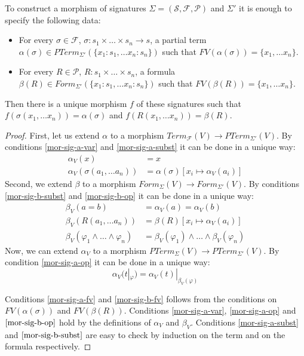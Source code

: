 \documentclass[reqno]{amsart}
\theoremstyle{definition}
\theoremstyle{remark}
\numberwithin{figure}{section}
\begin{document}
\begin{prop}
To construct a morphism of signatures $\Sigma = (\mathcal{S},\mathcal{F},\mathcal{P})$ and $\Sigma'$ it is enough to specify the following data:
\begin{itemize}
\item For every $\sigma \in \mathcal{F}$, $\sigma : s_1 \times \ldots \times s_n \to s$, a partial term $\alpha(\sigma) \in PTerm_{\Sigma'}(\{ x_1 : s_1, \ldots x_n : s_n \})$ such that $FV(\alpha(\sigma)) = \{ x_1, \ldots x_n \}$.
\item For every $R \in \mathcal{P}$, $R : s_1 \times \ldots \times s_n$, a formula $\beta(R) \in Form_{\Sigma'}(\{ x_1 : s_1, \ldots x_n : s_n \})$ such that $FV(\beta(R)) = \{ x_1, \ldots x_n \}$.
\end{itemize}
Then there is a unique morphism $f$ of these signatures such that $f(\sigma(x_1, \ldots x_n)) = \alpha(\sigma)$ and $f(R(x_1, \ldots x_n)) = \beta(R)$.
\end{prop}
\begin{proof}
First, let us extend $\alpha$ to a morphism $Term_\mathcal{F}(V) \to PTerm_{\Sigma'}(V)$.
By conditions \eqref{mor-sig-a-var} and \eqref{mor-sig-a-subst} it can be done in a unique way:
\begin{align*}
\alpha_V(x) & = x \\
\alpha_V(\sigma(a_1, \ldots a_n)) & = \alpha(\sigma)[x_i \mapsto \alpha_V(a_i)]
\end{align*}
Second, we extend $\beta$ to a morphism $Form_\Sigma(V) \to Form_{\Sigma'}(V)$.
By conditions \eqref{mor-sig-b-subst} and \eqref{mor-sig-b-op} it can be done in a unique way:
\begin{align*}
\beta_V(a = b) & = \alpha_V(a) = \alpha_V(b) \\
\beta_V(R(a_1, \ldots a_n)) & = \beta(R)[x_i \mapsto \alpha_V(a_i)] \\
\beta_V(\varphi_1 \land \ldots \land \varphi_n) & = \beta_V(\varphi_1) \land \ldots \land \beta_V(\varphi_n)
\end{align*}
Now, we can extend $\alpha_V$ to a morphism $PTerm_\Sigma(V) \to PTerm_{\Sigma'}(V)$.
By condition \eqref{mor-sig-a-op} it can be done in a unique way:
\[ \alpha_V(t|_\varphi) = \alpha_V(t)|_{\beta_V(\varphi)} \]

Conditions \eqref{mor-sig-a-fv} and \eqref{mor-sig-b-fv} follows from the conditions on $FV(\alpha(\sigma))$ and $FV(\beta(R))$.
Conditions \eqref{mor-sig-a-var}, \eqref{mor-sig-a-op} and $\eqref{mor-sig-b-op}$ hold by the definitions of $\alpha_V$ and $\beta_V$.
Conditions \eqref{mor-sig-a-subst} and $\eqref{mor-sig-b-subst}$ are easy to check by induction on the term and on the formula respectively.
\end{proof}
\end{document}
